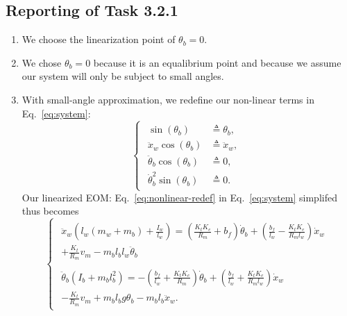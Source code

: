 \documentclass[11pt]{article} %
\begin{document}
\subsection*{Reporting of Task 3.2.1}
\begin{enumerate}
\item %
  We choose the linearization point of $\theta_b = 0$.
\item %
  We chose $\theta_b = 0$ because it is an equalibrium point and because we assume our system will only be subject to small angles.
\item %
  With small-angle approximation, we redefine our non-linear terms in Eq.~\eqref{eq:system}:
  \begin{equation}\label{eq:nonlinear-redef}
    \begin{cases}
      \begin{aligned}
        \sin(\theta_b) &\triangleq \theta_b, \\
        \ddot{x}_w \cos(\theta_b) &\triangleq \ddot{x}_w, \\
        \ddot{\theta}_b \cos(\theta_b) &\triangleq 0, \\
        \dot{\theta}_b^2 \sin(\theta_b) &\triangleq 0.
      \end{aligned}
    \end{cases}
  \end{equation}
  Our linearized \ac{EOM}: Eq.~\eqref{eq:nonlinear-redef}
  in Eq.~\eqref{eq:system} simplifed thus becomes
  \begin{equation}
    \begin{cases}
      \begin{aligned}
        \ddot{x}_w\left(l_w(m_w + m_b) + \frac{I_w}{l_w}\right) =
        \left(
          \frac{K_t K_e}{R_m}
          + b_f
        \right)\dot{\theta}_b
        +
        \left(
          \frac{b_f}{l_w}
          -
          \frac{K_t K_e}{R_m l_w}
        \right)\dot{x}_w
        \\
        + \frac{K_t}{R_m}v_m
        - m_b l_b l_w \ddot{\theta}_b
      \end{aligned}\\[2.5em]
      \begin{aligned}
        \ddot{\theta}_b\left(I_b + m_b l_b^2\right)
        =
        -\left(
          \frac{b_f}{l_w}
          +
          \frac{K_t K_e}{R_m}
        \right)\dot{\theta}_b
        + \left(
          \frac{b_f}{l_w} + \frac{K_t K_e}{R_m l_w}
        \right)\dot{x}_w
        \\
        - \frac{K_t}{R_m}v_m
        + m_b l_b g \theta_b
        - m_b l_b \ddot{x}_w.
      \end{aligned}
    \end{cases}
  \end{equation}
\end{enumerate}
\end{document}
